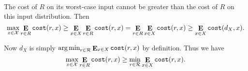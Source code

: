 The cost of $R$ on its worst-case input cannot be greater than the cost of $R$ on this input distribution. Then
\[\max_{x\in\mathcal{X}}\mathop{\mathbf{E}}_{r\in R}\texttt{cost}(r,x)
\ge \mathop{\mathbf{E}}_{x\in X}\mathop{\mathbf{E}}_{r\in R}\texttt{cost}(r,x)
= \mathop{\mathbf{E}}_{r\in R}\mathop{\mathbf{E}}_{x\in X}\texttt{cost}(r,x)
\ge \mathop{\mathbf{E}}_{x\in X}\texttt{cost}(d_X,x).\]

Now $d_X$ is simply $\mathop{\text{arg\,min}}_{r\in\mathcal{R}}\mathop{\mathbf{E}}_{x\in X}\texttt{cost}(r,x)$ by definition. Thus we have
\[\max_{x\in\mathcal{X}}\mathop{\mathbf{E}}_{r\in R}\texttt{cost}(r,x) \ge \min_{r\in\mathcal{R}}\mathop{\mathbf{E}}_{x\in X}\texttt{cost}(r,x).\]









